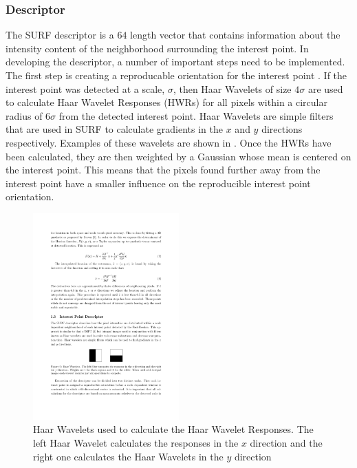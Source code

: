 \documentclass{article}
\begin{document}

\subsubsection{Descriptor}
\label{sec:2dsurfdescribe}
The SURF descriptor is a $64$ length vector that contains information about the intensity content of the neighborhood surrounding the interest point. In developing the descriptor, a number of important steps need to be implemented. The first step is creating a reproducable orientation for the interest point \cite{Bay2008}. If the interest point was detected at a scale, $\sigma$, then Haar Wavelets of size $4\sigma$ are used to calculate Haar Wavelet Responses (HWRs) for all pixels within a circular radius of $6\sigma$ from the detected interest point.  Haar Wavelets are simple filters that are used in SURF to calculate gradients in the $x$ and $y$ directions respectively. Examples of these wavelets are shown in  \cite{Evans2009}. Once the HWRs have been calculated, they are then weighted by a Gaussian whose mean is centered on the interest point. This means that the pixels found further away from the interest point have a smaller influence on the reproducible interest point orientation.\\


\begin{figure}[h!] 
  \centering
    \includegraphics[width=0.5\textwidth]{../Drawings/methods/SURF2D_HaarWavelets.pdf}
    \caption{Haar Wavelets used to calculate the Haar Wavelet Responses. The left Haar Wavelet calculates the responses in the $x$ direction and the right one calculates the Haar Wavelets in the $y$ direction}
    \label{fig:haar}
\end{figure}
\end{document}
